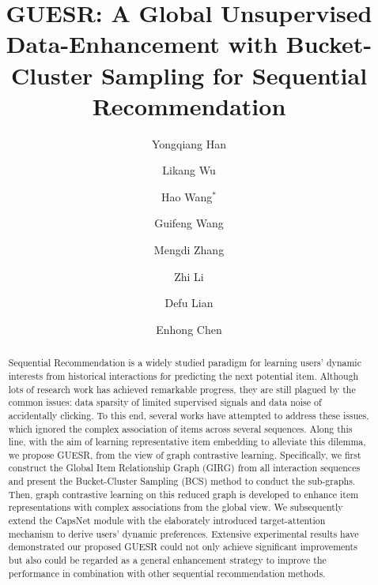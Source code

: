 \documentclass[runningheads]{llncs}
\begin{document}
\title{GUESR: A Global Unsupervised Data-Enhancement with Bucket-Cluster Sampling for Sequential Recommendation}
\vspace{-25pt}
\author{Yongqiang Han \and
Likang Wu \and Hao Wang$^{*}$ \and Guifeng Wang  \and  Mengdi Zhang \and  Zhi Li \and Defu Lian \and Enhong Chen}
%
%
%
\maketitle       
%
 \vspace{-20pt}
\begin{abstract}


Sequential Recommendation is a widely studied paradigm for learning users' dynamic interests from historical interactions for predicting the next potential item.
Although lots of research work has achieved remarkable progress, they are still plagued by the common issues: data sparsity of limited supervised signals and data noise of accidentally clicking. 
To this end, several works have attempted to address these issues, which ignored the complex association of items across several sequences. 
Along this line, with the aim of learning representative item embedding to alleviate this dilemma, we propose GUESR, from the view of graph contrastive learning.  
Specifically, we first construct the Global Item Relationship Graph (GIRG) from all interaction sequences and present the Bucket-Cluster Sampling (BCS) method to conduct the sub-graphs. 
Then, graph contrastive learning on this reduced graph is developed to enhance item representations with complex associations from the global view. 
We subsequently extend the CapsNet module with the elaborately introduced target-attention mechanism to derive users' dynamic preferences. Extensive experimental results have demonstrated our proposed GUESR could not only achieve significant improvements but also could be regarded as a general enhancement strategy to improve the performance in combination with other sequential recommendation methods. 
\vspace{-15pt}

\end{abstract}
\end{document}
